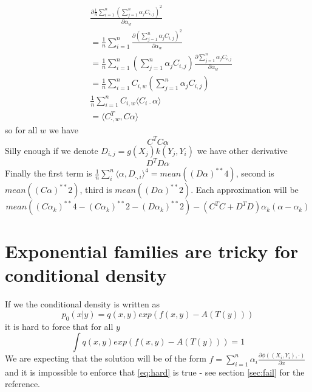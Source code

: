 \documentclass[10pt]{article}
\begin{document}
\begin{align}
  &\frac{  \partial  \frac 1 n  \sum_{i=1}^{n} \left(   \sum_{j=1}^{n} \alpha_j C_{i,j} \right)^2}{ \partial \alpha_w} \\
 & =\frac 1 n  \sum_{i=1}^{n}  \frac{ \partial \left(   \sum_{j=1}^{n} \alpha_j C_{i,j} \right)^2}{ \partial \alpha_w} \\
   &   = \frac 1 n  \sum_{i=1}^{n}   \left(   \sum_{j=1}^{n} \alpha_j C_{i,j} \right) \frac{ \partial \sum_{j=1}^{n} \alpha_j C_{i,j} }{ \partial \alpha_w} \\
   &=  \frac 1 n  \sum_{i=1}^{n}  C_{i,w} \left(   \sum_{j=1}^{n} \alpha_j C_{i,j} \right) \\
   &  \frac 1 n  \sum_{i=1}^{n}  C_{i,w} \langle C_{i\,\cdot} \alpha \rangle \\
   & = \langle C_{\cdot,w}^T , C\alpha \rangle
\end{align}
so for all $w$ we have 
$$
C^T C \alpha
$$
Silly enough if we denote  $D_{i,j} =  g(X_{j})  k(Y_{j},Y_i)$ we have other derivative 
$$
D^T D \alpha
$$
Finally the first term is $\frac 1 n \sum_{i}^{n} \langle \alpha, D_{\cdot,i} \rangle^4 = mean( (D\alpha)^{**}4)$, second is $mean( (C\alpha)^{**}2)$, 
third is $mean( (D\alpha)^{**}2)$. Each approximation will be
\begin{equation}
 mean( (C\alpha_k)^{**}4 - (C\alpha_k)^{**}2 - (D\alpha_k)^{**}2 ) - (C^T C+D^T D) \alpha_k (\alpha - \alpha_k ) 
\end{equation}


\section{Exponential families are tricky for conditional density}
If we the conditional density is written as 
\begin{equation}
p_0(x|y) = q(x,y)exp(f(x,y) - A(T(y)) )
\end{equation} 
it is hard to force that for all $y$
\begin{equation}
\label{eq:hard}
\int q(x,y)exp(f(x,y) - A(T(y)) )=1
\end{equation}
We are expecting that the solution will be of the form $f = \sum_{i=1}^n \alpha_i \frac{\partial  \phi( (X_i,Y_i), \cdot)} {\partial x} $ and it is impossible to enforce that \eqref{eq:hard} is true - see section \ref{sec:fail} for the reference.
\end{document}
